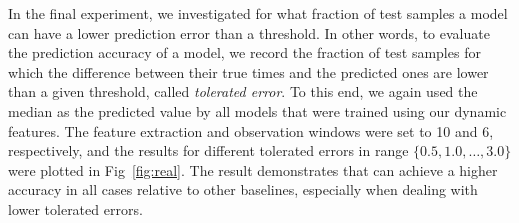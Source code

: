 In the final experiment, we investigated for what fraction of test samples a model can have a lower prediction error than a threshold. In other words, to evaluate the prediction accuracy of a model, we record the fraction of test samples for which the difference between their true times and the predicted ones are lower than a given threshold, called \emph{tolerated error}. To this end, we again used the median as the predicted value by all models that were trained using our dynamic features. The feature extraction and observation windows were set to 10 and 6, respectively, and the results for different tolerated errors in range $\{0.5, 1.0, \dots, 3.0\}$ were plotted in Fig~\ref{fig:real}. The result demonstrates that \npglm can achieve a higher accuracy in all cases relative to other baselines, especially when dealing with lower tolerated errors.

